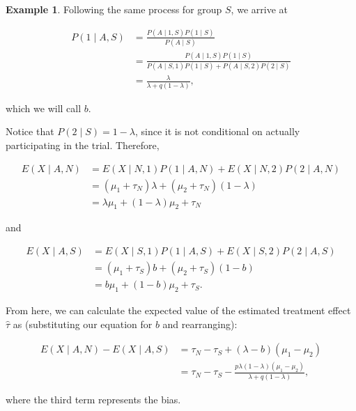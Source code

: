 \documentclass[
  openany]{book}
\theoremstyle{definition}
\theoremstyle{definition}
\newtheorem{example}{Example}[chapter]
\theoremstyle{definition}
\theoremstyle{definition}
\theoremstyle{remark}
\begin{document}
\begin{example}
Following the same process for group \(S\), we arrive at

\begin{align*}
P\left(1\mid{A,S}\right) & =  \frac{P\left(A\mid{1,S}\right)P\left(1\mid{S}\right)}{P\left(A\mid{S}\right)}\\
& = \frac{P\left(A\mid{1,S}\right)P\left(1\mid{S}\right)}{P\left(A\mid{S,1}\right)P\left(1\mid{S}\right) + P\left(A\mid{S,2}\right)P\left(2\mid{S}\right)} \\
& = \frac{\lambda}{\lambda + q\left(1-\lambda\right)},
\end{align*}

which we will call \(b\).

Notice that \(P\left(2\mid{S}\right)= 1-\lambda\), since it is not conditional on actually participating in the trial. Therefore,

\begin{align*}
E\left(X\mid{A,N}\right) & = E \left(X\mid{N,1}\right)P\left(1\mid{A,N}\right) + E \left(X\mid{N,2}\right)P\left(2\mid{A,N}\right) \\
& = \left(\mu_1 + \tau_N\right)\lambda + \left(\mu_2 + \tau_N\right)\left(1-\lambda\right) \\
& = \lambda\mu_1 + \left(1-\lambda\right)\mu_2 + \tau_N
\end{align*}

and

\begin{align*}
E\left(X\mid{A,S}\right) & = E \left(X\mid{S,1}\right)P\left(1\mid{A,S}\right) + E \left(X\mid{S,2}\right)P\left(2\mid{A,S}\right) \\
& = \left(\mu_1 + \tau_S\right)b + \left(\mu_2 + \tau_S\right)\left(1-b\right) \\
& = b\mu_1 + \left(1-b\right)\mu_2 + \tau_S.
\end{align*}

From here, we can calculate the expected value of the estimated treatment effect \(\hat\tau\) as (substituting our equation for \(b\) and rearranging):

\begin{align*}
E\left(X\mid{A,N}\right) - E\left(X\mid{A,S}\right) & = \tau_N - \tau_S + \left(\lambda - b\right)\left(\mu_1 - \mu_2\right) \\
& = \tau_N - \tau_S - \frac{p\lambda\left(1-\lambda\right)\left(\mu_1  - \mu_2\right)}{\lambda + q\left(1-\lambda\right)},
\end{align*}

where the third term represents the bias.


\end{example}
\end{document}
